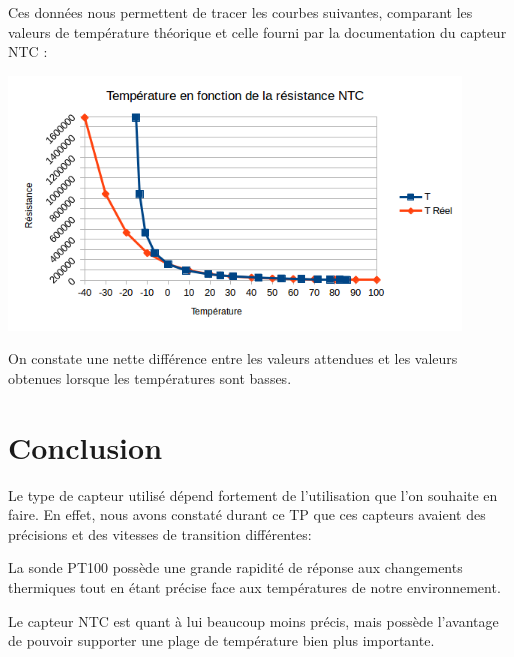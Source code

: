 \documentclass[a4paper,12pt]{article}
\begin{document}
			\par Ces données nous permettent de tracer les courbes suivantes, comparant les valeurs de température théorique et celle fourni par la documentation du capteur NTC :
			\begin{center}
				\includegraphics[width=12cm]{../Images/GraphNTC.png}
			\end{center}
			\par On constate une nette différence entre les valeurs attendues et les valeurs obtenues lorsque les températures sont basses.

	\section{Conclusion}
	\label{sec:Conclusion}
		\par Le type de capteur utilisé dépend fortement de l'utilisation que l'on souhaite en faire.
		En effet, nous avons constaté durant ce TP que ces capteurs avaient des précisions et des vitesses de transition différentes:
		\par La sonde PT100 possède une grande rapidité de réponse aux changements thermiques tout en étant précise face aux températures de notre environnement.
		\par Le capteur NTC est quant à lui beaucoup moins précis, mais possède l'avantage de pouvoir supporter une plage de température bien plus importante.
\end{document}

